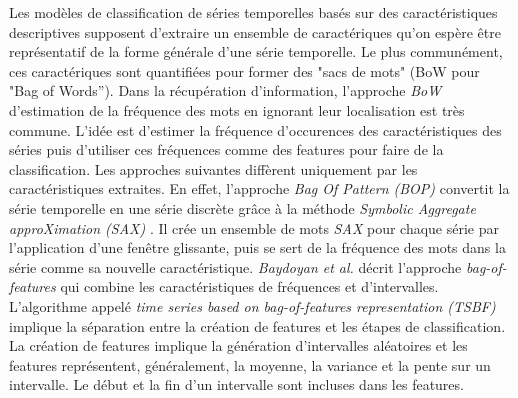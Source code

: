 Les mod\`eles de classification de s\'eries temporelles bas\'es sur des caract\'eristiques
descriptives  supposent  d'extraire  un  ensemble  de  caract\'eriques  qu'on  esp\`ere  \^etre
repr\'esentatif de la forme g\'en\'erale d'une s\'erie temporelle. Le plus commun\'ement,
ces caract\'eriques sont quantifi\'ees pour former des "sacs de mots" (BoW pour "Bag of Words'').
Dans la r\'ecup\'eration d'information, l'approche {\em BoW} d'estimation de la fr\'equence des mots en ignorant leur localisation est tr\`es commune. L'id\'ee est d'estimer la fr\'equence d'occurences des caract\'eristiques des s\'eries puis  d'utiliser ces fr\'equences comme des features pour faire de la  classification.
\newline
Les approches suivantes diff\`erent uniquement par les caract\'eristiques extraites.
En effet, l'approche {\em Bag Of Pattern (BOP)} \cite{lin2012rotation} convertit la s\'erie temporelle en une s\'erie discr\`ete gr\^ace \`a la m\'ethode {\em Symbolic Aggregate approXimation (SAX)} \cite{lin2007experiencing}. Il cr\'ee un ensemble de mots {\em SAX} pour chaque s\'erie par l'application d'une fen\^etre glissante, puis se sert de la fr\'equence des mots dans la s\'erie comme sa nouvelle caract\'eristique. 
{\em Baydoyan et al.} \cite{baydogan2013bag} d\'ecrit l'approche {\em bag-of-features} qui combine les caract\'eristiques de fr\'equences et d'intervalles. L'algorithme appel\'e {\em time series based on bag-of-features representation (TSBF)} implique la s\'eparation entre la cr\'eation de features et les \'etapes de classification. 
La cr\'eation de features implique la g\'en\'eration d'intervalles al\'eatoires et les features repr\'esentent, g\'en\'eralement, la moyenne, la variance et la pente sur un intervalle. 
Le d\'ebut et la fin d'un intervalle sont incluses dans les features. 